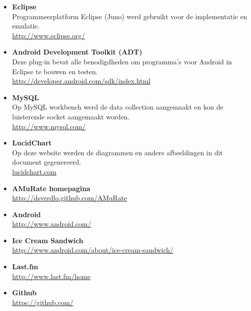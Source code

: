 \documentclass[11pt,a4paper]{article}
\begin{document}
	\begin{itemize}
		
	\item \textbf{Eclipse} \\
	Programmeerplatform Eclipse (Juno) werd gebruikt voor de implementatie en emulatie.	\\
	\url{http://www.eclipse.org/}

	\item \textbf{Android Development Toolkit (ADT)} \\
	Deze plug-in bevat alle benodigdheden om programma's voor Android in Eclipse te bouwen en testen.\\
	\url{http://developer.android.com/sdk/index.html}
	
	\item \textbf{MySQL} \\
	Op MySQL workbench werd de data collection aangemaakt en kon de luisterende socket aangemaakt worden. \\
	\url{http://www.mysql.com/}	
	
	\item \textbf{LucidChart} \\
	Op deze website werden de diagrammen en andere afbeeldingen in dit document gegenereerd.\\
	\url{lucidchart.com}
	
	\item \textbf{AMuRate homepagina} \\
		\url{http://dsverdlo.github.com/AMuRate}
		
	\item \textbf{Android} \\
		\url{http://www.android.com/}
		
	\item \textbf{Ice Cream Sandwich} \\
		\url{http://www.android.com/about/ice-cream-sandwich/}	
		
	\item \textbf{Last.fm} \\
		\url{http://www.last.fm/home}	
		
	\item \textbf{Github} \\
		\url{https://github.com/}



	\end{itemize}
\end{document}
